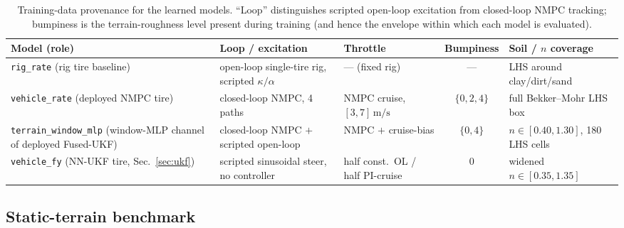 \documentclass[conference,letterpaper,10pt]{IEEEtran}
\begin{document}
\begin{table}[!t]
  \renewcommand{\arraystretch}{1.15}
  \caption{Training-data provenance for the learned models. ``Loop''
    distinguishes scripted open-loop excitation from closed-loop NMPC
    tracking; bumpiness is the terrain-roughness level present during
    training (and hence the envelope within which each model is
    evaluated).}
  \label{tab:training_data}
  \centering
  \small
  \begin{tabularx}{\textwidth}{@{}L L L c L@{}}
    \toprule
    \textbf{Model (role)} & \textbf{Loop / excitation} & \textbf{Throttle} & \textbf{Bumpiness} & \textbf{Soil / $n$ coverage}\\
    \midrule
    \texttt{rig\_rate} (rig tire baseline) & open-loop single-tire rig, scripted $\kappa/\alpha$ & --- (fixed rig) & --- & LHS around clay/dirt/sand\\
    \texttt{vehicle\_rate} (deployed NMPC tire) & closed-loop NMPC, 4 paths & NMPC cruise, $[3,7]\,\mathrm{m/s}$ & $\{0,2,4\}$ & full Bekker--Mohr LHS box\\
    \texttt{terrain\_window\_mlp} (window-MLP channel of deployed Fused-UKF) & closed-loop NMPC $+$ scripted open-loop & NMPC $+$ cruise-bias & $\{0,4\}$ & $n\in[0.40,1.30]$, 180 LHS cells\\
    \texttt{vehicle\_fy} (NN-UKF tire, Sec.~\ref{sec:ukf}) & scripted sinusoidal steer, no controller & half const.\ OL / half PI-cruise & $0$ & widened $n\in[0.35,1.35]$\\
    \bottomrule
  \end{tabularx}
\end{table}

\subsection{Static-terrain benchmark}
\label{sec:tires_static}
\end{document}
